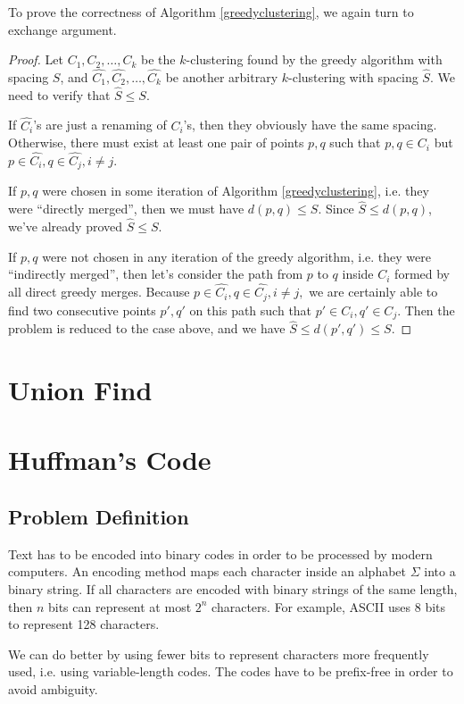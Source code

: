 To prove the correctness of Algorithm \ref{greedyclustering}, we again turn to exchange argument.
\begin{proof}
Let $C_1,C_2,\dots,C_k$ be the $k$-clustering found by the greedy algorithm with spacing $S$, and $\hat{C_1},\hat{C_2},\dots,\hat{C_k}$ be another arbitrary $k$-clustering with spacing $\hat{S}$. We need to verify that $\hat{S}\leq S$.

If $\hat{C_i}$'s are just a renaming of $C_i$'s, then they obviously have the same spacing. Otherwise, there must exist at least one pair of points $p,q$ such that $p,q\in C_i$ but $p\in \hat{C_i}, q\in\hat{C_j}, i\neq j.$

If $p,q$ were chosen in some iteration of Algorithm \ref{greedyclustering}, i.e. they were ``directly merged'', then we must have $d(p,q)\leq S$. Since $\hat{S}\leq d(p,q)$, we've already proved $\hat{S}\leq S$.

If $p,q$ were not chosen in any iteration of the greedy algorithm, i.e. they were ``indirectly merged'', then let's consider the path from $p$ to $q$ inside $C_i$ formed by all direct greedy merges. Because $p\in \hat{C_i}, q\in\hat{C_j}, i\neq j,$ we are certainly able to find two consecutive points $p',q'$ on this path such that $p'\in C_i, q'\in C_j$. Then the problem is reduced to the case above, and we have $\hat{S}\leq d(p',q')\leq S$.   
\end{proof}
\section{Union Find}
\section{Huffman's Code}
\subsection{Problem Definition}
Text has to be encoded into binary codes in order to be processed by modern computers. An encoding method maps each character inside an alphabet $\Sigma$ into a binary string. If all characters are encoded with binary strings of the same length, then $n$ bits can represent at most $2^n$ characters. For example, ASCII uses 8 bits to represent 128 characters. 

We can do better by using fewer bits to represent characters more frequently used, i.e. using variable-length codes. The codes have to be prefix-free in order to avoid ambiguity.

